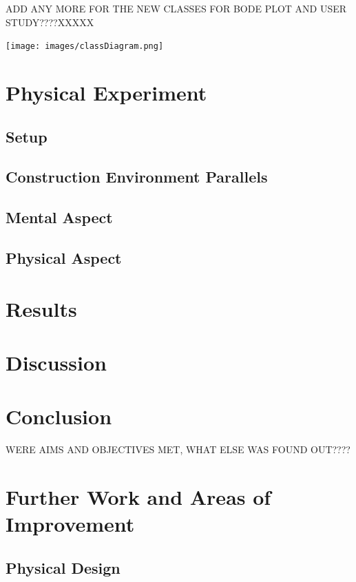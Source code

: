 \documentclass[11pt]{article}
\begin{document}
ADD ANY MORE FOR THE NEW CLASSES FOR BODE PLOT AND USER STUDY????XXXXX

\begin{landscape}

\begin{center}
\texttt{[image: images/classDiagram.png]}
\label{figure:classDiagram}
\end{center}


\end{landscape}



\section{Physical Experiment}
\subsection{Setup}
\subsection{Construction Environment Parallels}
\subsection{Mental Aspect}
\subsection{Physical Aspect}

\section{Results}

\section{Discussion}
\section{Conclusion}
WERE AIMS AND OBJECTIVES MET, WHAT ELSE WAS FOUND OUT????
\section{Further Work and Areas of Improvement}
\subsection{Physical Design}
\end{document}
